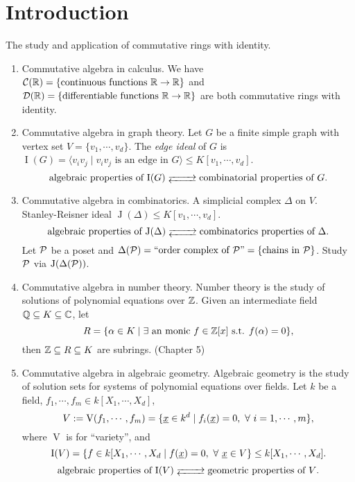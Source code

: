 \chapter*{Introduction}


The study and application of commutative rings with identity.
    \begin{enumerate}
        \item Commutative algebra in calculus. We have $\mathcal{C}(\mathbb{R}) = \{\text{continuous functions }\mathbb{R} \to \mathbb{R}\}$ and $\mathcal{D}(\mathbb{R}) = \{\text{differentiable functions }\mathbb{R} \to \mathbb{R}\}$ are both commutative rings with identity.
        \item Commutative algebra in graph theory. Let $G$ be a finite simple graph with vertex set $V = \{v_1,\cdots,v_d\}$. The \emph{edge ideal} of $G$ is $\operatorname{I}(G) = \langle v_iv_j \mid v_iv_j \text{ is an edge in }G \rangle \leq K[v_1,\cdots,v_d]$. 
            \[\text{algebraic properties of $\operatorname{I}(G)$} \myrightleftarrows{\rule{0.8cm}{0cm}} \text{combinatorial properties of $G$}.\]
        \item Commutative algebra in combinatorics.  A simplicial complex $\Delta$ on $V$. Stanley-Reisner ideal $\operatorname{J}(\Delta) \leq K[v_1,\cdots,v_d]$. 
            \[\text{algebraic properties of $\operatorname{J}(\Delta)$} \myrightleftarrows{\rule{0.8cm}{0cm}} \text{combinatorics properties of $\Delta$}.\]
            Let $\mathcal{P}$ be a poset and $\Delta(\mathcal{P}) = ``\text{order complex of $\mathcal{P}$''} = \{\text{chains in $\mathcal{P}$}\}$. Study $\mathcal{P}$ via $\operatorname{J}(\Delta(\mathcal{P}))$. 
        \item Commutative algebra in number theory. Number theory is the study of solutions of polynomial equations over $\mathbb{Z}$. Given an intermediate field $\mathbb{Q} \subseteq K \subseteq \mathbb{C}$, let 
            \[R = \{\alpha \in K \mid \exists \  \text{an monic }f \in \mathbb{Z}[x] \text{ s.t. } f(\alpha) = 0\},\] 
            then $\mathbb{Z} \subseteq R \subseteq K$ are subrings. (Chapter 5)
        \item Commutative algebra in algebraic geometry. Algebraic geometry is the study of solution sets for systems of polynomial equations over fields. Let $k$ be a field, $f_1,\cdots,f_m \in k[X_1,\cdots,X_d]$, 
            \[V := \operatorname{V}(f_1,\cdots,f_m) = \{\underline x \in k^d \mid f_i(\underline x) = 0,\ \forall \  i = 1,\cdots,m\},\] 
            where $\operatorname{V}$ is for ``variety'', and 
            \[\operatorname{I}(V) = \{f \in k[X_1,\cdots,X_d \mid f(\underline x) = 0,\ \forall \  \underline x \in V\} \leq k[X_1,\cdots,X_d].\] 
            \[\text{algebraic properties of $\operatorname{I}(V)$} \myrightleftarrows{\rule{0.8cm}{0cm}} \text{geometric properties of $V$}.\]
    \end{enumerate}

